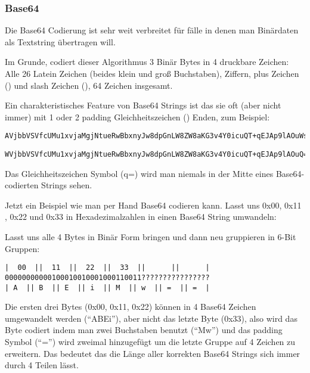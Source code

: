 \subsubsection{Base64}

Die Base64 Codierung ist sehr weit verbreitet für fälle in denen man Binärdaten als Textstring übertragen will.

Im Grunde, codiert dieser Algorithmus 3 Binär Bytes in 4 druckbare Zeichen: 
Alle 26 Latein Zeichen (beides klein und groß Buchstaben), Ziffern, plus Zeichen (\q{+}) und slash Zeichen (\q{/}),
64 Zeichen insgesamt. 

Ein charakteristisches Feature von Base64 Strings ist das sie oft (aber nicht immer) mit 1 oder 2  \gls{padding}
Gleichheitszeichen (\q{=}) Enden, zum Beispiel: 

\begin{lstlisting}
AVjbbVSVfcUMu1xvjaMgjNtueRwBbxnyJw8dpGnLW8ZW8aKG3v4Y0icuQT+qEJAp9lAOuWs=
\end{lstlisting}

\begin{lstlisting}
WVjbbVSVfcUMu1xvjaMgjNtueRwBbxnyJw8dpGnLW8ZW8aKG3v4Y0icuQT+qEJAp9lAOuQ==
\end{lstlisting}

Das Gleichheitszeichen Symbol (q{=}) wird man niemals in der Mitte eines Base64-codierten
Strings sehen.

Jetzt ein Beispiel wie man per Hand Base64 codieren kann.
Lasst uns 0x00, 0x11 , 0x22 und 0x33 in Hexadezimalzahlen in einen Base64
String umwandeln: 



Lasst uns alle 4 Bytes in Binär Form bringen und dann neu gruppieren in 6-Bit Gruppen:

\begin{lstlisting}
|  00  ||  11  ||  22  ||  33  ||      ||      |
00000000000100010010001000110011????????????????
| A  || B  || E  || i  || M  || w  || =  || =  |
\end{lstlisting}

Die ersten drei Bytes (0x00, 0x11, 0x22) können in 4 Base64 Zeichen umgewandelt werden (``ABEi''),
aber nicht das letzte Byte (0x33), also wird das Byte codiert indem man zwei Buchstaben 
benutzt (``Mw'') und das \gls{padding} Symbol (``='') wird zweimal hinzugefügt um die letzte
Gruppe auf 4 Zeichen zu erweitern. Das bedeutet das die Länge aller korrekten Base64 Strings
sich immer durch 4 Teilen lässt. 


